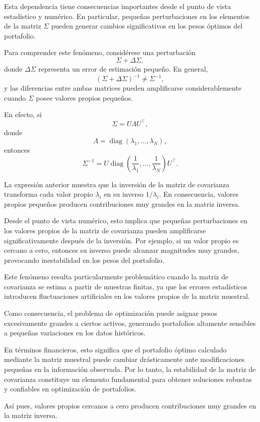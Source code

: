 \documentclass[letterpaper,12pt,oneside]{book}
\begin{document}
Esta dependencia tiene consecuencias importantes desde el punto de vista estadístico y numérico. En particular, pequeñas perturbaciones en los elementos de la matriz \(\Sigma\) pueden generar cambios significativos en los pesos óptimos del portafolio.

Para comprender este fenómeno, considérese una perturbación
\[
\Sigma + \Delta\Sigma,
\]
donde \(\Delta\Sigma\) representa un error de estimación pequeño. En general,
\[
(\Sigma+\Delta\Sigma)^{-1}
\neq
\Sigma^{-1},
\]
y las diferencias entre ambas matrices pueden amplificarse considerablemente cuando \(\Sigma\) posee valores propios pequeños.

En efecto, si
\[
\Sigma
=
U\Lambda U^\top,
\]
donde
\[
\Lambda
=
\operatorname{diag}(\lambda_1,\dots,\lambda_N),
\]
entonces
\[
\Sigma^{-1}
=
U
\operatorname{diag}
\left(
\frac{1}{\lambda_1},
\dots,
\frac{1}{\lambda_N}
\right)
U^\top.
\]

La expresión anterior muestra que la inversión de la matriz de covarianza transforma cada valor propio \(\lambda_i\) en su inverso \(1/\lambda_i\). En consecuencia, valores propios pequeños producen contribuciones muy grandes en la matriz inversa.

Desde el punto de vista numérico, esto implica que pequeñas perturbaciones en los valores propios de la matriz de covarianza pueden amplificarse significativamente después de la inversión. Por ejemplo, si un valor propio es cercano a cero, entonces su inverso puede alcanzar magnitudes muy grandes, provocando inestabilidad en los pesos del portafolio.

Este fenómeno resulta particularmente problemático cuando la matriz de covarianza se estima a partir de muestras finitas, ya que los errores estadísticos introducen fluctuaciones artificiales en los valores propios de la matriz muestral.

Como consecuencia, el problema de optimización puede asignar pesos excesivamente grandes a ciertos activos, generando portafolios altamente sensibles a pequeñas variaciones en los datos históricos.

En términos financieros, esto significa que el portafolio óptimo calculado mediante la matriz muestral puede cambiar drásticamente ante modificaciones pequeñas en la información observada. Por lo tanto, la estabilidad de la matriz de covarianza constituye un elemento fundamental para obtener soluciones robustas y confiables en optimización de portafolios.

Así pues, valores propios cercanos a cero producen contribuciones muy grandes en la matriz inversa.
\end{document}
